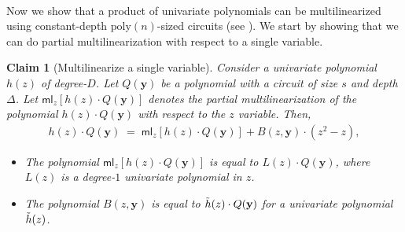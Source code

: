 \documentclass[11pt]{article}
\newtheorem{claim}[theorem]{Claim}
\newcommand{\ml}{\mathsf{ml}}
\begin{document}
\paragraph{}Now we show that a product of univariate polynomials can be multilinearized using constant-depth $\mathrm{poly}(n)$-sized circuits (see ). We start by showing that we can do partial multilinearization with respect to a single variable.

\begin{claim}[Multilinearize a single variable]
\label{claim:multilinearize-one-var}
Consider a univariate polynomial $h(z)$ of degree-$D$. Let $Q(\mathbf{y})$ be a polynomial with a circuit of size $s$ and depth $\Delta$. Let $\ml_{z}[h(z) \cdot Q(\mathbf{y})]$ denotes the partial multilinearization of the polynomial $h(z) \cdot Q(\mathbf{y})$ with respect to the $z$ variable.\newline
Then,
\begin{align*}
    h(z) \cdot Q(\mathbf{y}) \; = \; \ml_{z}[h(z) \cdot Q(\mathbf{y})] + B(z,\mathbf{y}) \cdot (z^{2} - z),
\end{align*}
\begin{itemize}
    \item The polynomial $\ml_{z}[h(z) \cdot Q(\mathbf{y})]$ is equal to $L(z)\cdot  Q(\mathbf{y})$, where $L(z)$ is a degree-$1$ univariate polynomial in $z$.
    \item The polynomial $B(z,\mathbf{y})$ is equal to $\Tilde{h}(z) \cdot Q(\mathbf{y})$ for a univariate polynomial $\Tilde{h}(z)$.
\end{itemize}
\end{claim}
\end{document}
